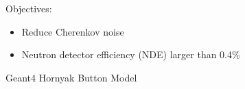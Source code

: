 \documentclass[fleqn]{beamer}
\begin{document}
\begin{frame}
\begin{columns}[c]
\begin{column}{.5\textwidth}
{}
      \end{column}
     \end{columns}
     \vspace{.5cm}
     Objectives:
     \begin{itemize}
      \item Reduce Cherenkov noise
      \item Neutron detector efficiency (NDE) larger than 0.4\% \cite{de1975fast}
     \end{itemize}
     \end{frame}
     
     \begin{frame}
      \centering
      Geant4 Hornyak Button Model
     \end{frame}
\end{document}
